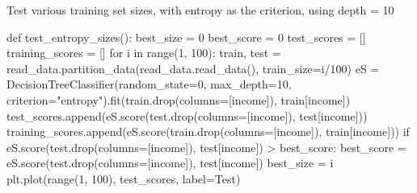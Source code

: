 \documentclass[
  letterpaper,
  DIV=11,
  numbers=noendperiod]{scrartcl}
\newenvironment{Shaded}{\begin{snugshade}}{\end{snugshade}}
\newcommand{\BuiltInTok}[1]{\textcolor[rgb]{0.00,0.23,0.31}{#1}}
\newcommand{\CommentTok}[1]{\textcolor[rgb]{0.37,0.37,0.37}{#1}}
\newcommand{\ControlFlowTok}[1]{\textcolor[rgb]{0.00,0.23,0.31}{#1}}
\newcommand{\DecValTok}[1]{\textcolor[rgb]{0.68,0.00,0.00}{#1}}
\newcommand{\KeywordTok}[1]{\textcolor[rgb]{0.00,0.23,0.31}{#1}}
\newcommand{\NormalTok}[1]{\textcolor[rgb]{0.00,0.23,0.31}{#1}}
\newcommand{\OperatorTok}[1]{\textcolor[rgb]{0.37,0.37,0.37}{#1}}
\newcommand{\StringTok}[1]{\textcolor[rgb]{0.13,0.47,0.30}{#1}}
\begin{document}
\begin{Shaded}
\begin{Highlighting}[]
\CommentTok{\textquotesingle{}\textquotesingle{}\textquotesingle{}Test various training set sizes, with entropy as the criterion, using depth = 10\textquotesingle{}\textquotesingle{}\textquotesingle{}}

\KeywordTok{def}\NormalTok{ test\_entropy\_sizes():}
\NormalTok{    best\_size }\OperatorTok{=} \DecValTok{0}
\NormalTok{    best\_score }\OperatorTok{=} \DecValTok{0}
\NormalTok{    test\_scores }\OperatorTok{=}\NormalTok{ []}
\NormalTok{    training\_scores }\OperatorTok{=}\NormalTok{ []}
    \ControlFlowTok{for}\NormalTok{ i }\KeywordTok{in} \BuiltInTok{range}\NormalTok{(}\DecValTok{1}\NormalTok{, }\DecValTok{100}\NormalTok{):}
\NormalTok{        train, test }\OperatorTok{=}\NormalTok{ read\_data.partition\_data(read\_data.read\_data(), train\_size}\OperatorTok{=}\NormalTok{i}\OperatorTok{/}\DecValTok{100}\NormalTok{)}
\NormalTok{        eS }\OperatorTok{=}\NormalTok{ DecisionTreeClassifier(random\_state}\OperatorTok{=}\DecValTok{0}\NormalTok{, max\_depth}\OperatorTok{=}\DecValTok{10}\NormalTok{, }
\NormalTok{            criterion}\OperatorTok{=}\StringTok{"entropy"}\NormalTok{).fit(train.drop(columns}\OperatorTok{=}\NormalTok{[}\StringTok{\textquotesingle{}income\textquotesingle{}}\NormalTok{]), train[}\StringTok{\textquotesingle{}income\textquotesingle{}}\NormalTok{])}
\NormalTok{        test\_scores.append(eS.score(test.drop(columns}\OperatorTok{=}\NormalTok{[}\StringTok{\textquotesingle{}income\textquotesingle{}}\NormalTok{]), test[}\StringTok{\textquotesingle{}income\textquotesingle{}}\NormalTok{]))}
\NormalTok{        training\_scores.append(eS.score(train.drop(columns}\OperatorTok{=}\NormalTok{[}\StringTok{\textquotesingle{}income\textquotesingle{}}\NormalTok{]), train[}\StringTok{\textquotesingle{}income\textquotesingle{}}\NormalTok{]))}
        \ControlFlowTok{if}\NormalTok{ eS.score(test.drop(columns}\OperatorTok{=}\NormalTok{[}\StringTok{\textquotesingle{}income\textquotesingle{}}\NormalTok{]), test[}\StringTok{\textquotesingle{}income\textquotesingle{}}\NormalTok{]) }\OperatorTok{\textgreater{}}\NormalTok{ best\_score:}
\NormalTok{            best\_score }\OperatorTok{=}\NormalTok{ eS.score(test.drop(columns}\OperatorTok{=}\NormalTok{[}\StringTok{\textquotesingle{}income\textquotesingle{}}\NormalTok{]), test[}\StringTok{\textquotesingle{}income\textquotesingle{}}\NormalTok{])}
\NormalTok{            best\_size }\OperatorTok{=}\NormalTok{ i}
\NormalTok{    plt.plot(}\BuiltInTok{range}\NormalTok{(}\DecValTok{1}\NormalTok{, }\DecValTok{100}\NormalTok{), test\_scores, label}\OperatorTok{=}\StringTok{\textquotesingle{}Test\textquotesingle{}}\NormalTok{)}

\end{Highlighting}
\end{Shaded}
\end{document}
